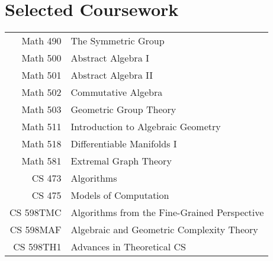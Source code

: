 \documentclass[11pt,a4paper,sans]{moderncv}
\begin{document}



\section{Selected Coursework}
{
\setlength{\tabcolsep}{6pt}
\begin{tabular}{rl}
  Math 490 & The Symmetric Group                                                          \\
  Math 500 & Abstract Algebra I                                                           \\
  Math 501 & Abstract Algebra II                                                          \\
  Math 502 & Commutative Algebra                                                          \\
  Math 503 & Geometric Group Theory                                                       \\
  Math 511 & Introduction to Algebraic Geometry                                           \\
  Math 518 & Differentiable Manifolds I                                                   \\
  Math 581 & Extremal Graph Theory                                                        \\
  CS 473 & Algorithms                                                                     \\
  CS 475 & Models of Computation                                                          \\
  CS 598TMC & Algorithms from the Fine-Grained Perspective                                \\
  CS 598MAF & Algebraic and Geometric Complexity Theory                                   \\
  CS 598TH1 & Advances in Theoretical CS                                                  \\
\end{tabular}
}
\end{document}
